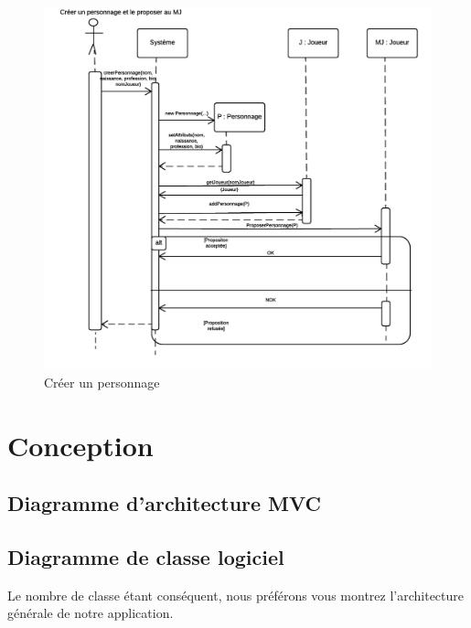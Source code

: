 \documentclass[a4paper,oneside,10pt]{article}
\begin{document}
\begin{figure}[H]
	\begin{center}
		\includegraphics[width=12cm]{images/sequence/DS-CreerPerso.png}  
		\caption{Créer un personnage}
	\end{center}
\end{figure}


\pagebreak

\section{Conception}


\subsection{Diagramme d'architecture MVC}


\subsection{Diagramme de classe logiciel}

Le nombre de classe étant conséquent, nous préférons vous montrez l'architecture générale de notre application. 
\end{document}
